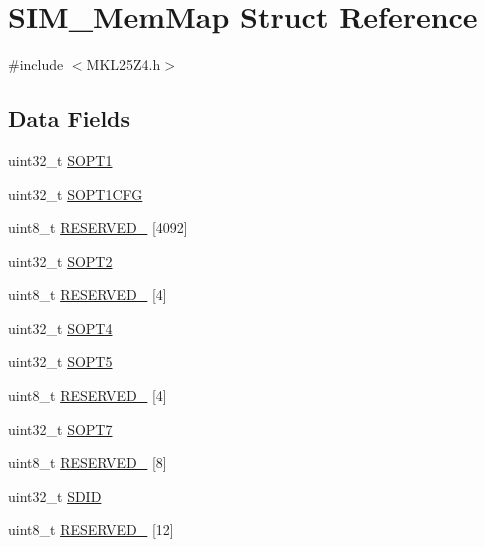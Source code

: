\hypertarget{struct_s_i_m___mem_map}{}\section{S\+I\+M\+\_\+\+Mem\+Map Struct Reference}
\label{struct_s_i_m___mem_map}


{\ttfamily \#include $<$M\+K\+L25\+Z4.\+h$>$}

\subsection*{Data Fields}
\begin{DoxyCompactItemize}
\item 
uint32\+\_\+t \hyperlink{struct_s_i_m___mem_map_a4aba1e2e56918ee06126ced3810264d4}{S\+O\+P\+T1}
\item 
uint32\+\_\+t \hyperlink{struct_s_i_m___mem_map_a8fdfe78d66039ba5cfbf48cf8a267bee}{S\+O\+P\+T1\+C\+FG}
\item 
uint8\+\_\+t \hyperlink{struct_s_i_m___mem_map_ae7904b8fe3af1def40d58c2ca8123e44}{R\+E\+S\+E\+R\+V\+E\+D\+\_} \mbox{[}4092\mbox{]}
\item 
uint32\+\_\+t \hyperlink{struct_s_i_m___mem_map_aa99d50c9e64bf212c32cfde56465e569}{S\+O\+P\+T2}
\item 
uint8\+\_\+t \hyperlink{struct_s_i_m___mem_map_a422ac2beba1cc5c797380d1c5832b885}{R\+E\+S\+E\+R\+V\+E\+D\+\_} \mbox{[}4\mbox{]}
\item 
uint32\+\_\+t \hyperlink{struct_s_i_m___mem_map_a6f70ab94a412c93f57c2ca3ee84dbdd3}{S\+O\+P\+T4}
\item 
uint32\+\_\+t \hyperlink{struct_s_i_m___mem_map_adff606be08a472231b4f9f5afd603bd6}{S\+O\+P\+T5}
\item 
uint8\+\_\+t \hyperlink{struct_s_i_m___mem_map_acc19a07675d1806592b3ed4a92f91e1c}{R\+E\+S\+E\+R\+V\+E\+D\+\_} \mbox{[}4\mbox{]}
\item 
uint32\+\_\+t \hyperlink{struct_s_i_m___mem_map_a613f7f9e67cc95762537d6cbf4800ae0}{S\+O\+P\+T7}
\item 
uint8\+\_\+t \hyperlink{struct_s_i_m___mem_map_a86684537b595133db57a7bcc73843d2a}{R\+E\+S\+E\+R\+V\+E\+D\+\_} \mbox{[}8\mbox{]}
\item 
uint32\+\_\+t \hyperlink{struct_s_i_m___mem_map_a05732d81c464fe278244a2027960ddc1}{S\+D\+ID}
\item 
uint8\+\_\+t \hyperlink{struct_s_i_m___mem_map_a8c752b26764b7d15368cf85fe57a34b9}{R\+E\+S\+E\+R\+V\+E\+D\+\_} \mbox{[}12\mbox{]}

\end{DoxyCompactItemize}

